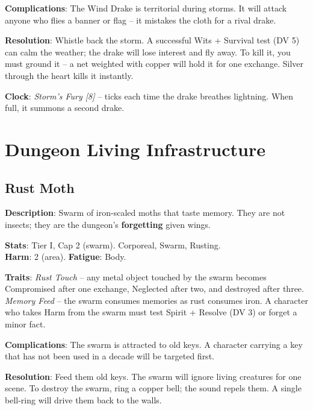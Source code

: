 \noindent\textbf{Complications}: The Wind Drake is territorial during storms. It will attack anyone who flies a banner or flag -- it mistakes the cloth for a rival drake.

\noindent\textbf{Resolution}: Whistle back the storm. A successful Wits + Survival test (DV 5) can calm the weather; the drake will lose interest and fly away. To kill it, you must ground it -- a net weighted with copper will hold it for one exchange. Silver through the heart kills it instantly.

\noindent\textbf{Clock}: \emph{Storm's Fury [8]} -- ticks each time the drake breathes lightning. When full, it summons a second drake.


\section*{Dungeon Living Infrastructure}

\subsection*{Rust Moth}

\noindent\textbf{Description}: Swarm of iron-scaled moths that taste memory. They are not insects; they are the dungeon's \textbf{forgetting} given wings.

\noindent\textbf{Stats}: Tier I, Cap 2 (swarm). Corporeal, Swarm, Rusting.\\
\textbf{Harm}: 2 (area). \textbf{Fatigue}: Body.

\noindent\textbf{Traits}: 
\emph{Rust Touch} -- any metal object touched by the swarm becomes Compromised after one exchange, Neglected after two, and destroyed after three. \emph{Memory Feed} -- the swarm consumes memories as rust consumes iron. A character who takes Harm from the swarm must test Spirit + Resolve (DV 3) or forget a minor fact.

\noindent\textbf{Complications}: The swarm is attracted to old keys. A character carrying a key that has not been used in a decade will be targeted first.

\noindent\textbf{Resolution}: Feed them old keys. The swarm will ignore living creatures for one scene. To destroy the swarm, ring a copper bell; the sound repels them. A single bell-ring will drive them back to the walls.


